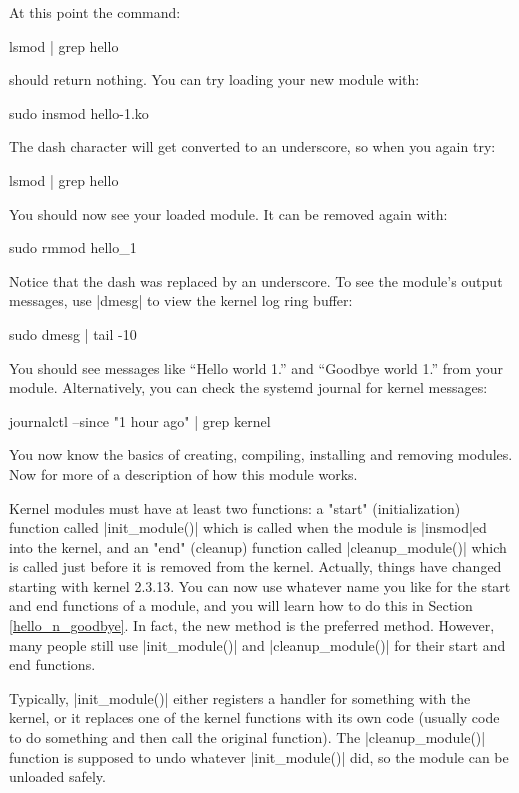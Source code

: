 \documentclass[10pt, oneside]{book}
\begin{document}
At this point the command:
\begin{codebash}
lsmod | grep hello
\end{codebash}

should return nothing.
You can try loading your new module with:
\begin{codebash}
sudo insmod hello-1.ko
\end{codebash}

The dash character will get converted to an underscore, so when you again try:
\begin{codebash}
lsmod | grep hello
\end{codebash}

You should now see your loaded module. It can be removed again with:
\begin{codebash}
sudo rmmod hello_1
\end{codebash}

Notice that the dash was replaced by an underscore.
To see the module's output messages, use \sh|dmesg| to view the kernel log ring buffer:
\begin{codebash}
sudo dmesg | tail -10
\end{codebash}

You should see messages like ``Hello world 1.'' and ``Goodbye world 1.'' from your module.
Alternatively, you can check the systemd journal for kernel messages:
\begin{codebash}
journalctl --since "1 hour ago" | grep kernel
\end{codebash}

You now know the basics of creating, compiling, installing and removing modules.
Now for more of a description of how this module works.

Kernel modules must have at least two functions: a "start" (initialization) function called \cpp|init_module()| which is called when the module is \sh|insmod|ed into the kernel, and an "end" (cleanup) function called \cpp|cleanup_module()| which is called just before it is removed from the kernel.
Actually, things have changed starting with kernel 2.3.13.
You can now use whatever name you like for the start and end functions of a module, and you will learn how to do this in Section \ref{hello_n_goodbye}.
In fact, the new method is the preferred method.
However, many people still use \cpp|init_module()| and \cpp|cleanup_module()| for their start and end functions.

Typically, \cpp|init_module()| either registers a handler for something with the kernel, or it replaces one of the kernel functions with its own code (usually code to do something and then call the original function).
The \cpp|cleanup_module()| function is supposed to undo whatever \cpp|init_module()| did, so the module can be unloaded safely.
\end{document}

